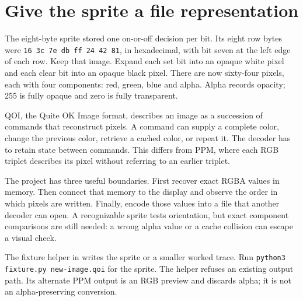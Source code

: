 \section{Give the sprite a file representation}
The eight-byte sprite stored one on-or-off decision per bit. Its eight row bytes were
\texttt{16 3c 7e db ff 24 42 81}, in hexadecimal, with bit seven at the left edge of
each row. Keep that image. Expand each set bit into an opaque white pixel and each
clear bit into an opaque black pixel. There are now sixty-four pixels, each with four
components: red, green, blue and alpha. Alpha records opacity; 255 is fully opaque and
zero is fully transparent.

QOI, the Quite OK Image format, describes an image as a succession of commands that
reconstruct pixels. A command can supply a complete color, change the previous color,
retrieve a cached color, or repeat it. The decoder has to retain state between commands.
This differs from PPM, where each RGB triplet describes its pixel without referring to
an earlier triplet.

The project has three useful boundaries. First recover exact RGBA values in memory.
Then connect that memory to the display and observe the order in which pixels are
written. Finally, encode those values into a file that another decoder can open. A
recognizable sprite tests orientation, but exact component comparisons are still
needed: a wrong alpha value or a cache collision can escape a visual check.

The fixture helper in  writes the sprite or a smaller worked
trace. Run \texttt{python3 fixture.py new-image.qoi} for the sprite. The helper refuses
an existing output path. Its alternate PPM output is an RGB preview and discards alpha;
it is not an alpha-preserving conversion.
